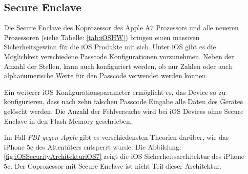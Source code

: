 \subsection{Secure Enclave}
\label{sec:Frage1SecureEnclave}
 
 Die Secure Enclave des Koprozessor des Apple A7 Prozessors und alle neueren Prozessoren (siehe Tabelle: \ref{tab:iOSHW}) bringen einen massiven Sicherheitsgewinn für die iOS Produkte mit sich. Unter iOS gibt es die Möglichkeit verschiedene Passcode Konfigurationen vorzunehmen. Neben der Anzahl der Stellen, kann auch konfiguriert werden, ob nur Zahlen oder auch alphanumerische Werte für den Passcode verwendet werden können.\par 
 Ein weiterer iOS Konfigurationsparameter ermöglicht es, das Device so zu konfigurieren, dass nach zehn falschen Passcode Eingabe alle Daten des Gerätes gelöscht werden. Die Anzahl der Fehlversuche wird bei iOS Devices ohne Secure Enclave in den Flash Memory geschrieben. \par
 Im Fall \textit{\glqq FBI gegen Apple\grqq{}} gibt es verschiedensten Theorien darüber, wie das iPhone 5c des Attentäters entsperrt wurde. Die Abbildung: \ref{fig:iOSSecurityArchitekturiOS7} zeigt die iOS Sicherheitsarchitektur des iPhone 5c. Der Coprozessor mit Secure Enclave ist nicht Teil dieser Architektur. 

